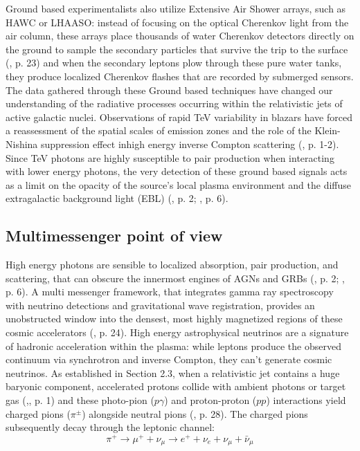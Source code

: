 \documentclass{aa} %
\begin{document}
Ground based experimentalists also utilize Extensive Air Shower arrays, such as HAWC or LHAASO: instead of focusing on the optical Cherenkov light from the air column, these arrays place thousands of water Cherenkov detectors directly on the ground to sample the secondary particles that survive the trip to the surface (\citet{Addazietal2021}, p. 23) and when the secondary leptons plow through these pure water tanks, they produce localized Cherenkov flashes that are recorded by submerged sensors.
The data gathered through these Ground based techniques have changed our understanding of the radiative processes occurring within the relativistic jets of active galactic nuclei. Observations of rapid TeV variability in blazars have forced a reassessment of the spatial scales of emission zones and the role of the Klein-Nishina suppression effect inhigh energy inverse Compton scattering (\citet{Boettcheretal1996}, p. 1-2). Since TeV photons are highly susceptible to pair production when interacting with lower energy photons, the very detection of these ground based signals acts as a limit on the opacity of the source's local plasma environment and the diffuse extragalactic background light (EBL) (\citet{Boettcheretal1996}, p. 2; \citet{KumarandZhang2015}, p. 6).

\subsection{Multimessenger point of view}
High energy photons are sensible to localized absorption, pair production, and scattering, that can obscure the innermost engines of AGNs and GRBs (\citet{Boettcheretal1996}, p. 2; \citet{KumarandZhang2015}, p. 6). A multi messenger framework, that integrates gamma ray spectroscopy with neutrino detections and gravitational wave registration, provides an unobstructed window into the densest, most highly magnetized regions of these cosmic accelerators (\citet{Addazietal2021}, p. 24).
High energy astrophysical neutrinos are a signature of hadronic acceleration within the plasma: while leptons produce the observed continuum via synchrotron and inverse Compton, they can't generate cosmic neutrinos. As established in Section 2.3, when a relativistic jet contains a huge baryonic component, accelerated protons collide with ambient photons or target gas (\citet{Boettcheretal1996},\citet{Kafexhiuetal2019}, p. 1) and these photo-pion ($p\gamma$) and proton-proton ($pp$) interactions yield charged pions ($\pi^\pm$) alongside neutral pions (\citet{KumarandZhang2015}, p. 28). The charged pions subsequently decay through the leptonic channel:
\begin{equation}
    \pi^+ \rightarrow \mu^+ + \nu_\mu \rightarrow e^+ + \nu_e + \nu_\mu + \bar{\nu}_\mu
\end{equation}
\end{document}
